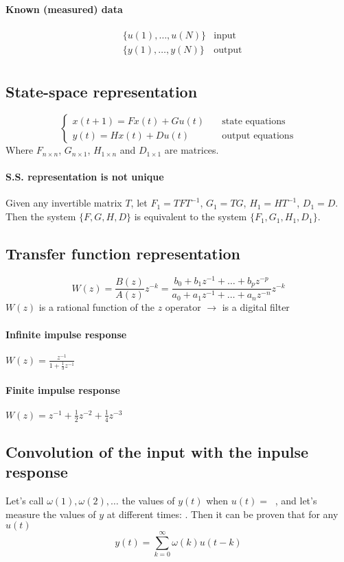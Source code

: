 \documentclass{article}
\DeclareMathOperator{\imp}{impulse(0)}
\begin{document}
\paragraph{Known (measured) data}
\begin{align*}
&\{u(1),\dots,u(N)\}&\text{input}\\
&\{y(1),\dots,y(N)\}&\text{output}\\
\end{align*}
\subsection{State-space representation}
\[
\begin{cases}
x(t+1)=Fx(t)+Gu(t)&\quad\text{state equations}\\
y(t)=Hx(t)+Du(t)&\quad\text{output equations}
\end{cases}
\]
Where $F_{n\times n}$, $G_{n\times 1}$, $H_{1\times n}$ and $D_{1\times 1}$ are matrices.
\paragraph{S.S. representation is not unique} Given any invertible matrix $T$, let $F_1=TFT^{-1}$, $G_1=TG$, $H_1=HT^{-1}$, $D_1=D$. Then the system $\{F,G,H,D\}$ is equivalent to the system $\{F_1,G_1,H_1,D_1\}$.
\subsection{Transfer function representation}
\[
W(z)
=
\frac{B(z)}{A(z)}z^{-k}
=
\frac{
	b_0+b_1z^{-1}+\dots+b_pz^{-p}
}{
	a_0+a_1z^{-1}+\dots+a_nz^{-n}
}z^{-k}
\]
$W(z)$ is a rational function of the $z$ operator $\rightarrow$ is a digital filter
\paragraph{Infinite impulse response} 
$W(z)=
\frac{
	z^{-1}
}{
	1+\frac{1}{3}z^{-1}
}$
\paragraph{Finite impulse response}
$
W(z)=z^{-1}+\frac{1}{2}z^{-2}+\frac{1}{4}z^{-3}
$

\subsection{Convolution of the input with the inpulse response}
Let's call $\omega(1), \omega(2), \dots$ the values of $y(t)$ when $u(t)=\imp$, and let's measure the values of $y$ at different times: . Then it can be proven that for any $u(t)$
\[
y(t)=\sum_{k=0}^\infty \omega(k)u(t-k)
\]
\end{document}
